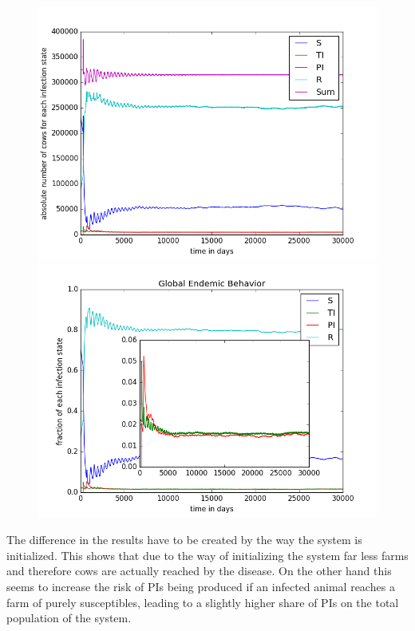 \begin{figure}[htbp]
\begin{minipage}{0.5\textwidth}
\centering
\noindent\includegraphics[width=0.95\linewidth,height=\textheight,
keepaspectratio]{cont1totalEndemicNumbers.png} 
\end{minipage}
\begin{minipage}{0.5\textwidth}
\centering
\noindent\includegraphics[width=0.95\linewidth,height=\textheight,
keepaspectratio]{cont1endemicFractions.png} 
\end{minipage}
\caption[Endemic Behavior in Containment Strategy One]{}
\label{fig:cont1Behav}
\end{figure} 

The difference in the results have to be created by the way the system is initialized. This shows that due to the way of initializing the system far less farms and therefore cows are actually reached by the disease. On the other hand this seems to increase the risk of PIs being produced if an infected animal reaches a farm of purely susceptibles, leading to a slightly higher share of PIs on the total population of the system.

